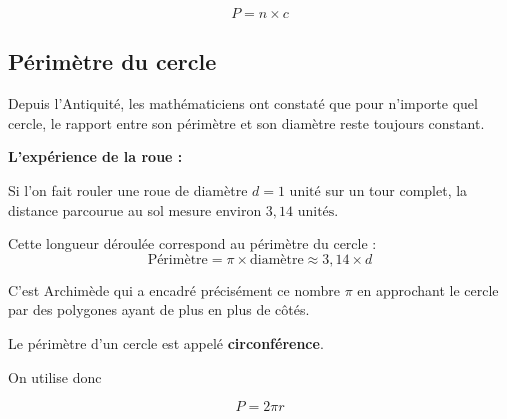 \documentclass[../../syllabus_1.tex]{subfiles}
\begin{document}
\[
P=n\times c
\]

\subsection{Périmètre du cercle}

\begin{tcolorbox}[title=Point historique : la formule du périmètre et le nombre $\pi$]
Depuis l'Antiquité, les mathématiciens ont constaté que pour n'importe quel cercle, le rapport entre son périmètre et son diamètre reste toujours constant.

\smallskip
\textbf{L'expérience de la roue :}

Si l'on fait rouler une roue de diamètre $d = 1\text{ unit\'e}$ sur un tour complet, la distance parcourue au sol mesure environ $3{,}14\text{ unit\'es}$.

\begin{center}
\end{center}

Cette longueur déroulée correspond au périmètre du cercle :
\[
\text{Périmètre} = \pi \times \text{diamètre} \approx 3{,}14 \times d
\]

C'est Archimède qui a encadré précisément ce nombre $\pi$ en approchant le cercle par des polygones ayant de plus en plus de côtés.
\end{tcolorbox}


Le périmètre d'un cercle est appelé \textbf{circonférence}.

On utilise donc 

\[
P=2\pi r
\]
\end{document}
